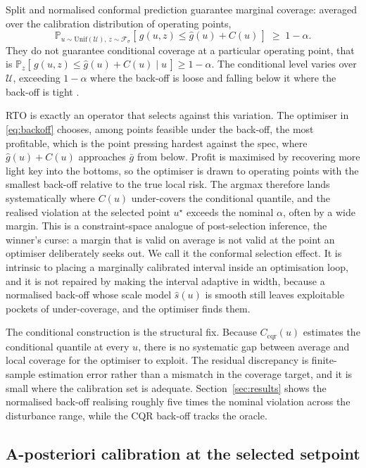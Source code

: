 Split and normalised conformal prediction guarantee marginal coverage: averaged over the
calibration distribution of operating points,
\begin{equation}
\mathbb{P}_{u\sim\mathrm{Unif}(\mathcal U),\,z\sim\mathcal F_\sigma}\!\left[\,g(u,z)\le \hat g(u)+C(u)\,\right]\;\ge\;1-\alpha .
\label{eq:marginal}
\end{equation}
They do not guarantee conditional coverage at a particular operating point, that is
$\mathbb{P}_{z}[\,g(u,z)\le\hat g(u)+C(u)\mid u\,]\ge 1-\alpha$. The conditional level varies
over $\mathcal U$, exceeding $1-\alpha$ where the back-off is loose and falling below it where
the back-off is tight \citep{gibbscherian2023}.

RTO is exactly an operator that selects against this variation. The optimiser in
\eqref{eq:backoff} chooses, among points feasible under the back-off, the most profitable,
which is the point pressing hardest against the spec, where $\hat g(u)+C(u)$ approaches $\bar
g$ from below. Profit is maximised by recovering more light key into the bottoms, so the
optimiser is drawn to operating points with the smallest back-off relative to the true local
risk. The argmax therefore lands systematically where $C(u)$ under-covers the conditional
quantile, and the realised violation at the selected point $u^\star$ exceeds the nominal
$\alpha$, often by a wide margin. This is a constraint-space analogue of post-selection
inference, the winner's curse: a margin that is valid on average is not valid at the point an
optimiser deliberately seeks out. We call it the conformal selection effect. It is intrinsic
to placing a marginally calibrated interval inside an optimisation loop, and it is not
repaired by making the interval adaptive in width, because a normalised back-off whose scale
model $\hat s(u)$ is smooth still leaves exploitable pockets of under-coverage, and the
optimiser finds them.

The conditional construction is the structural fix. Because $C_{\mathrm{cqr}}(u)$ estimates
the conditional quantile at every $u$, there is no systematic gap between average and local
coverage for the optimiser to exploit. The residual discrepancy is finite-sample estimation
error rather than a mismatch in the coverage target, and it is small where the calibration
set is adequate. Section~\ref{sec:results} shows the normalised back-off realising roughly
five times the nominal violation across the disturbance range, while the CQR back-off tracks
the oracle.

\subsection{A-posteriori calibration at the selected setpoint}
\label{sec:methods-apost}

